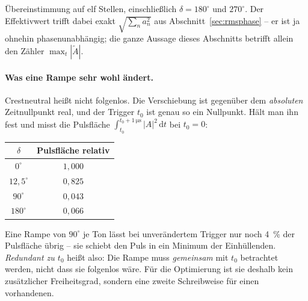 \documentclass[11pt,a4paper]{article}
\begin{document}
\noindent Übereinstimmung auf elf Stellen, einschließlich $\delta=180^\circ$
und $270^\circ$. Der Effektivwert trifft dabei exakt
$\sqrt{\sum_n a_n^2}$ aus Abschnitt~\ref{sec:rmsphase} -- er ist ja ohnehin
phasenunabhängig; die ganze Aussage dieses Abschnitts betrifft allein den
Zähler $\max_t|\tilde A|$.

\paragraph{Was eine Rampe sehr wohl ändert.}
Crestneutral heißt nicht folgenlos. Die Verschiebung ist gegenüber dem
\emph{absoluten} Zeitnullpunkt real, und der Trigger $t_0$ ist genau so ein
Nullpunkt. Hält man ihn fest und misst die Pulsfläche
$\int_{t_0}^{t_0+\SI{1}{\micro\second}}|A|^2\,\mathrm{d}t$ bei $t_0=0$:

\begin{center}
\begin{tabular}{cc}
  \toprule
  $\delta$ & Pulsfläche relativ\\
  \midrule
  $0^\circ$      & $1{,}000$\\
  $12{,}5^\circ$ & $0{,}825$\\
  $90^\circ$     & $0{,}043$\\
  $180^\circ$    & $0{,}066$\\
  \bottomrule
\end{tabular}
\end{center}

\noindent Eine Rampe von $90^\circ$ je Ton lässt bei unverändertem Trigger
nur noch \SI{4}{\percent} der Pulsfläche übrig -- sie schiebt den Puls in ein
Minimum der Einhüllenden. \emph{Redundant zu $t_0$} heißt also: Die Rampe
muss \emph{gemeinsam} mit $t_0$ betrachtet werden, nicht dass sie folgenlos
wäre. Für die Optimierung ist sie deshalb kein zusätzlicher Freiheitsgrad,
sondern eine zweite Schreibweise für einen vorhandenen.
\end{document}
